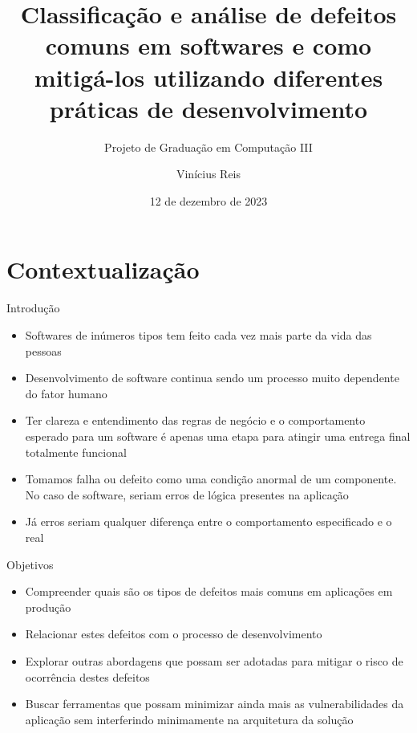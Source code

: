 \documentclass[brazilian]{beamer}
\author{Vinícius Reis}
\title[PGC III]{Classificação e análise de defeitos comuns em softwares e como mitigá-los utilizando diferentes práticas de desenvolvimento}
\subtitle{Projeto de Graduação em Computação III}
\institute{UFABC}
\date{12 de dezembro de 2023}
\begin{document}
\begin{frame}
    \titlepage
\end{frame}


\section{Contextualização}


\begin{frame}{Introdução}
    \begin{itemize}
        \item Softwares de inúmeros tipos tem feito cada vez mais parte da vida das pessoas
        \item Desenvolvimento de software continua sendo um processo muito dependente do fator humano
        \item Ter clareza e entendimento das regras de negócio e o comportamento esperado para um software é apenas uma etapa para atingir uma entrega final totalmente funcional
        \item Tomamos falha ou defeito como uma condição anormal de um componente. No caso de software, seriam erros de lógica presentes na aplicação
        \item Já erros seriam qualquer diferença entre o comportamento especificado e o real
    \end{itemize}
\end{frame}

\begin{frame}{Objetivos}
    \begin{itemize}
        \item Compreender quais são os tipos de defeitos mais comuns em aplicações em produção
        \item Relacionar estes defeitos com o processo de desenvolvimento
        \item Explorar outras abordagens que possam ser adotadas para mitigar o risco de ocorrência destes defeitos
        \item Buscar ferramentas que possam minimizar ainda mais as vulnerabilidades da aplicação sem interferindo minimamente na arquitetura da solução
    \end{itemize}
\end{frame}
\end{document}
